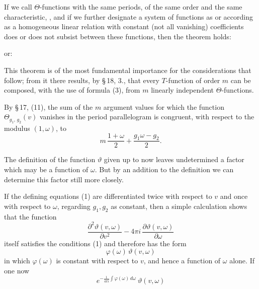 
If we call $\Theta$-functions with the same periods, of the same
order and the same characteristic, , and if we further
designate a system of functions as 
or  according as a homogeneous linear relation
with constant (not all vanishing) coefficients
does or does not subsist between these functions, then the
theorem holds:


or:


This theorem is of the most fundamental importance for the
considerations that follow; from it there results, by \S\,18, 3.,
that every $T$-function of order $m$ can be composed, with the use of formula (3),
from $m$ linearly independent $\Theta$-functions.

By \S\,17, (11), the sum of the $m$ argument values for
which the function $\Theta_{g_1,\, g_2}(v)$ vanishes in the period parallelogram
is congruent, with respect to the modulus $(1, \omega)$, to
\[
m\,\frac{1+\omega}{2} + \frac{g_1\omega - g_2}{2}.
\]

The definition of the function $\vartheta$ given up to now leaves
undetermined a factor which may be a function of $\omega$. But
by an addition to the definition we can determine this factor
still more closely.

If the defining equations (1) are differentiated twice with respect to $v$
and once with respect to $\omega$, regarding $g_1, g_2$ as constant,
then a simple calculation shows that the function
\[
\frac{\partial^2 \vartheta(v,\omega)}{\partial v^2} - 4\pi i\,\frac{\partial \vartheta(v,\omega)}{\partial \omega}
\]
itself satisfies the conditions (1) and therefore has the form
\[
\varphi(\omega)\,\vartheta(v,\omega)
\]
in which $\varphi(\omega)$ is constant with respect to $v$, and hence a function of $\omega$
alone. If one now
\[
e^{-\frac{1}{4\pi i}\int \varphi(\omega)\,d\omega}\ \vartheta(v,\omega)
\]
